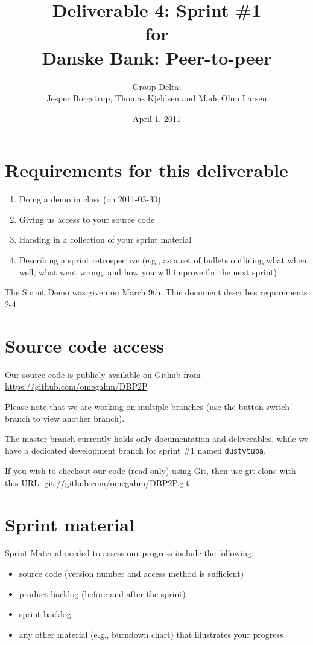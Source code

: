 \documentclass[a4paper,11pt]{article}
\title{Deliverable 4: Sprint \#1\\\small{for}\\\small{Danske Bank: Peer-to-peer}}
\author{ Group Delta:\\Jesper Borgstrup, Thomas Kjeldsen and Mads Ohm Larsen }
\date{April 1, 2011}
\begin{document}
\ifpdf
{}
\else
{}
\fi

\maketitle


\section{Requirements for this deliverable}
\begin{enumerate}
\item Doing a demo in class (on 2011-03-30)
\item Giving us access to your source code
\item Handing in a collection of your sprint material
\item Describing a sprint retrospective (e.g., as a set of bullets outlining what
when well, what went wrong, and how you will improve for the next sprint)
\end{enumerate}

The Sprint Demo was given on March 9th. This document describes requirements 2-4.

\section{Source code access}
Our source code is publicly available on Github from \url{https://github.com/omegahm/DBP2P}.

Please note that we are working on multiple branches (use the button switch branch to view another branch).

The master branch currently holds only documentation and deliverables, while we have a dedicated development branch for sprint \#1 named \texttt{dustytuba}.

If you wish to checkout our code (read-only) using Git, then use git clone with this URL:
\url{git://github.com/omegahm/DBP2P.git}


\section{Sprint material}
Sprint Material needed to assess our progress include the following:
\begin{itemize}
\item source code (version number and access method is sufficient)
\item product backlog (before and after the sprint)
\item sprint backlog
\item any other material (e.g., burndown chart) that illustrates your progress
\end{itemize}
\end{document}
